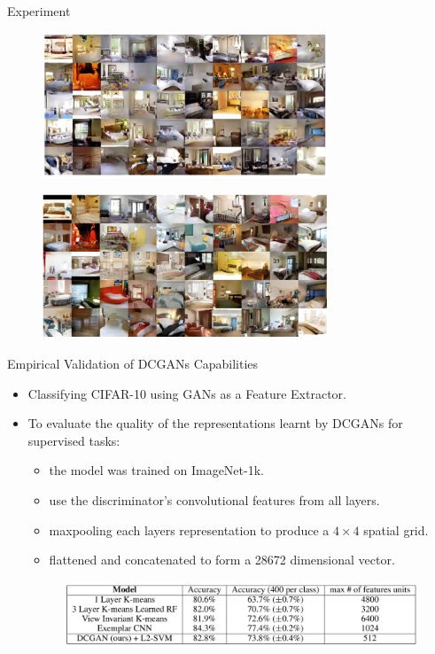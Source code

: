 \documentclass[10pt]{beamer}
\begin{document}
	\begin{frame}{Experiment}
		\begin{figure}
			\includegraphics[width=23em]{figures/DCGAN-generated-image-epoch-1.png}
		\end{figure}
		\vspace{-1.5em}
		\begin{figure}
			\includegraphics[width=23em]{figures/DCGAN-generated-image-epoch-5.png}
		\end{figure}
	\end{frame}

	\begin{frame}{Empirical Validation of DCGANs Capabilities}
		\begin{itemize}
			\pause
			\item Classifying CIFAR-10 using GANs as a Feature Extractor.
			\pause
			\item To evaluate the quality of the representations learnt by DCGANs for supervised tasks:
			\begin{itemize}
				\pause
				\item the model was trained on ImageNet-1k.
				\pause
				\item use the discriminator's convolutional features from all layers.
				\pause
				\item maxpooling each layers representation to produce a $4\times 4$ spatial grid.
				\pause
				\item flattened and concatenated to form a 28672 dimensional vector.
			\end{itemize}
			\begin{figure}
				\includegraphics[width=30em]{figures/DCGAN-discriminator-feature-extractor-cifar-10.png}
			\end{figure}
		\end{itemize}
	\end{frame}
\end{document}
